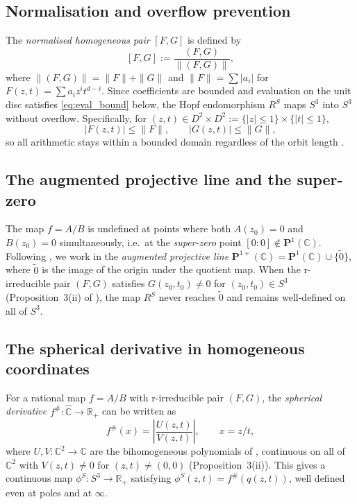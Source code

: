 \documentclass[12pt]{article}
\theoremstyle{definition}
\newcommand{\C}{\mathbb{C}}
\newcommand{\R}{\mathbb{R}}
\newcommand{\Chat}{\hat{\C}}
\newcommand{\Pone}{\mathbf{P}^1(\C)}
\newcommand{\Poneplus}{\mathbf{P}^{1+}(\C)}
\newcommand{\fsh}{f^{\#}}            %
\newcommand{\RS}{R^S}
\begin{document}
\subsection{Normalisation and overflow prevention}

The \emph{normalised homogeneous pair} $[F,G]$ is defined by
\[
  [F,G] := \frac{(F,G)}{\|(F,G)\|},
\]
where $\|(F,G)\| = \|F\| + \|G\|$ and $\|F\| = \sum |a_i|$ for
$F(z,t) = \sum a_i z^i t^{d-i}$.  Since coefficients are bounded and
evaluation on the unit disc satisfies \eqref{eq:eval_bound} below, the
Hopf endomorphism $\RS$ maps $S^3$ into $S^3$ without overflow.
Specifically, for $(z,t) \in D^2 \times D^2 := \{|z|\le 1\}\times\{|t|\le
1\}$,
\begin{equation}\label{eq:eval_bound}
  |F(z,t)| \le \|F\|, \qquad |G(z,t)| \le \|G\|,
\end{equation}
so all arithmetic stays within a bounded domain regardless of the orbit
length \cite[Prop.~2]{Alvarez2023}.

\subsection{The augmented projective line and the super-zero}

The map $f = A/B$ is undefined at points where both $A(z_0) = 0$ and
$B(z_0) = 0$ simultaneously, i.e.~at the \emph{super-zero} point
$[0:0] \notin \Pone$.  Following \cite[Def.~9]{Alvarez2023}, we work
in the \emph{augmented projective line}
$\Poneplus = \Pone \cup \{\tilde{0}\}$,
where $\tilde{0}$ is the image of the origin under the quotient map.  When
the r-irreducible pair $(F,G)$ satisfies $G(z_0,t_0) \ne 0$ for
$(z_0,t_0) \in S^3$ (Proposition~3(ii) of \cite{Alvarez2023}), the map
$\RS$ never reaches $\tilde{0}$ and remains well-defined on all of $S^3$.

\subsection{The spherical derivative in homogeneous coordinates}

For a rational map $f = A/B$ with r-irreducible pair $(F,G)$, the
\emph{spherical derivative} $\fsh: \Chat \to \R_+$ can be written as
\[
  \fsh(x) = \left|\frac{U(z,t)}{V(z,t)}\right|, \qquad x = z/t,
\]
where $U, V: \C^2 \to \C$ are the bihomogeneous polynomials of
\cite[Def.~16]{Alvarez2023}, continuous on all of $\C^2$ with $V(z,t)\ne
0$ for $(z,t)\ne(0,0)$ (Proposition~3(ii)).  This gives a continuous
map $\phi^S: S^3 \to \R_+$ satisfying $\phi^S(z,t) = \fsh(q(z,t))$,
well defined even at poles and at $\infty$.
\end{document}
